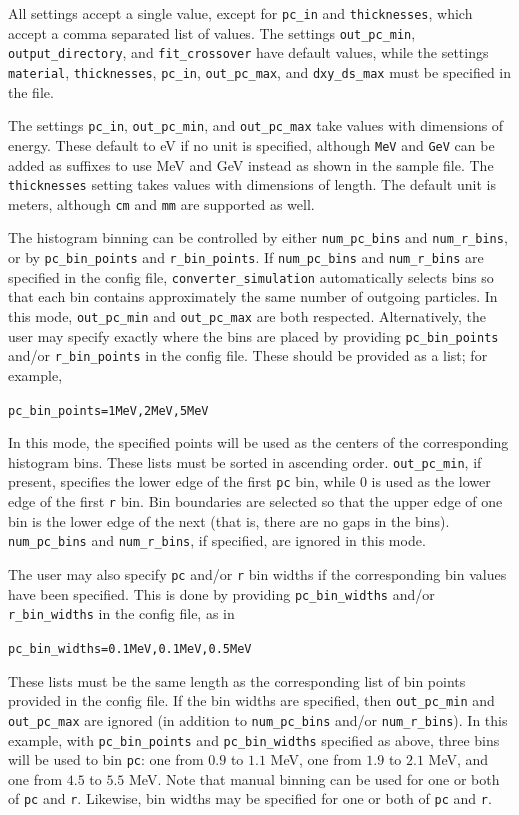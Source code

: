 \documentclass[12pt]{article}
\newcommand{\exes}{\texttt{converter\_simulation}\xspace}
\newcommand{\targetm}{\texttt{material}\xspace}
\newcommand{\targett}{\texttt{thicknesses}\xspace}
\newcommand{\pcin}{\texttt{pc\_in}\xspace}
\newcommand{\outpcmin}{\texttt{out\_pc\_min}\xspace}
\newcommand{\outpcmax}{\texttt{out\_pc\_max}\xspace}
\newcommand{\dxydsmax}{\texttt{dxy\_ds\_max}\xspace}
\newcommand{\outdir}{\texttt{output\_directory}\xspace}
\newcommand{\numrbins}{\texttt{num\_r\_bins}\xspace}
\newcommand{\numpcbins}{\texttt{num\_pc\_bins}\xspace}
\newcommand{\fitxpt}{\texttt{fit\_crossover}\xspace}
\newcommand{\pcbinvals}{\texttt{pc\_bin\_points}\xspace}
\newcommand{\pcbinwids}{\texttt{pc\_bin\_widths}\xspace}
\newcommand{\rbinvals}{\texttt{r\_bin\_points}\xspace}
\newcommand{\rbinwids}{\texttt{r\_bin\_widths}\xspace}
\newenvironment{example}
  {\vspace{-2.5ex} \begin{alltt}}
  {\end{alltt} \vspace{-2.2ex}}
\begin{document}
All settings accept a single value, except for \pcin and \targett, which accept a comma separated
list of values.  The settings \outpcmin, \outdir, and \fitxpt have default values, while
the settings \targetm, \targett, \pcin, \outpcmax, and \dxydsmax must be specified in the file.

The settings \pcin, \outpcmin, and \outpcmax take values with dimensions of energy.  These default
to eV if no unit is specified, although \texttt{MeV} and \texttt{GeV} can be added as suffixes to
use MeV and GeV instead as shown in the sample file.  The \targett setting takes values with
dimensions of length.  The default unit is meters, although \texttt{cm} and \texttt{mm} are
supported as well.

The histogram binning can be controlled by either \numpcbins and \numrbins, or by \pcbinvals and \rbinvals.
If \numpcbins and \numrbins are specified in the config file, \exes automatically selects bins so that each bin contains approximately the same number of outgoing particles.
In this mode, \outpcmin and \outpcmax are both respected.
Alternatively, the user may specify exactly where the bins are placed by providing \pcbinvals and/or \rbinvals in the config file.
These should be provided as a list; for example,
\begin{example}
  pc_bin_points = 1 MeV, 2 MeV, 5 MeV
\end{example}
In this mode, the specified points will be used as the centers of the corresponding histogram bins.
These lists must be sorted in ascending order.
\outpcmin, if present, specifies the lower edge of the first \texttt{pc} bin, while 0 is used as the lower edge of the first \texttt{r} bin.
Bin boundaries are selected so that the upper edge of one bin is the lower edge of the next (that is, there are no gaps in the bins).
\numpcbins and \numrbins, if specified, are ignored in this mode.

The user may also specify \texttt{pc} and/or \texttt{r} bin widths if the corresponding bin values have been specified.
This is done by providing \pcbinwids and/or \rbinwids in the config file, as in
\begin{example}
  pc_bin_widths = 0.1 MeV, 0.1 MeV, 0.5 MeV
\end{example}
These lists must be the same length as the corresponding list of bin points provided in the config file.
If the bin widths are specified, then \outpcmin and \outpcmax are ignored (in addition to \numpcbins and/or \numrbins).
In this example, with \pcbinvals and \pcbinwids specified as above, three bins will be used to bin \texttt{pc}: one from $0.9$ to $1.1$ MeV, one from $1.9$ to $2.1$ MeV, and one from $4.5$ to $5.5$ MeV.
Note that manual binning can be used for one or both of \texttt{pc} and \texttt{r}.
Likewise, bin widths may be specified for one or both of \texttt{pc} and \texttt{r}.
\end{document}
